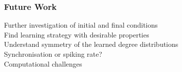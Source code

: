 \begin{frame}
\frametitle{Future Work}
\tabitem Further investigation of initial and final conditions \\
\tabitem Find learning strategy with desirable properties \\
\tabitem Understand symmetry of the learned degree distributions \\
\tabitem Synchronisation or spiking rate? \\
\tabitem Computational challenges
\end{frame}

